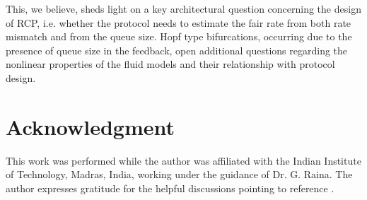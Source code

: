 \documentclass[conference]{IEEEtran}
\begin{document}
This, we believe, sheds light on a key architectural question concerning the design of RCP, i.e. whether the protocol needs to estimate the fair rate from both rate mismatch and from the queue size. Hopf type bifurcations, occurring due to the presence of queue size in the feedback, open additional questions regarding the nonlinear properties of the fluid models and their relationship with protocol design.



\section*{Acknowledgment}
This work was performed while the author was affiliated with the Indian Institute of Technology, Madras, India, working under the guidance of Dr. G. Raina. The author expresses gratitude for the helpful discussions pointing to reference \cite{krv}.


\balance


\end{document}

